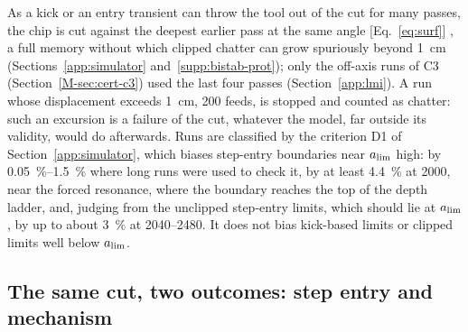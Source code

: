 As a kick or an entry transient can throw the tool out of the cut for many passes, the chip is cut against the deepest earlier pass at the same angle [Eq.~\eqref{eq:surf}] \citep{tlusty1981basic}, a full memory without which clipped chatter can grow spuriously beyond \SI{1}{\centi\metre} (Sections~\ref{app:simulator} and~\ref{supp:bistab-prot}); only the off-axis runs of C3 (Section~\ref{M-sec:cert-c3}) used the last four passes (Section~\ref{app:lmi}). A run whose displacement exceeds \SI{1}{\centi\metre}, 200 feeds, is stopped and counted as chatter: such an excursion is a failure of the cut, whatever the model, far outside its validity, would do afterwards. Runs are classified by the criterion D1 of Section~\ref{app:simulator}, which biases step-entry boundaries near $a_{\lim}$ high: by \SIrange{0.05}{1.5}{\percent} where long runs were used to check it, by at least \SI{4.4}{\percent} at \SI{2000}{\rpm}, near the forced resonance, where the boundary reaches the top of the depth ladder, and, judging from the unclipped step-entry limits, which should lie at $a_{\lim}$, by up to about \SI{3}{\percent} at 2040--\SI{2480}{\rpm}. It does not bias kick-based limits or clipped limits well below $a_{\lim}$.

\subsection{The same cut, two outcomes: step entry and mechanism}\label{supp:std-bistab-two}

